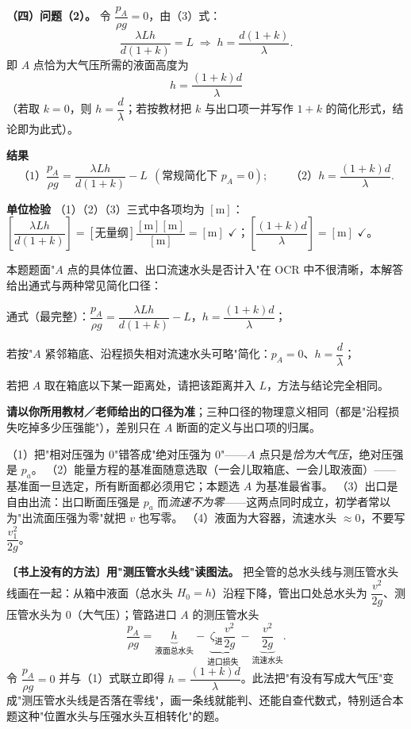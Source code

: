 \begin{jie}
\textbf{（四）问题（2）。} 令 $\dfrac{p_A}{\rho g}=0$，由（3）式：
\[\frac{\lambda Lh}{d(1+k)}=L\;\Longrightarrow\;h=\frac{d(1+k)}{\lambda}.\]
即 $A$ 点恰为大气压所需的液面高度为
\[\boxed{h=\frac{(1+k)d}{\lambda}}\]
（若取 $k=0$，则 $h=\dfrac{d}{\lambda}$；若按教材把 $k$ 与出口项一并写作 $1+k$ 的简化形式，结论即为此式）。

\textbf{结果}
\[\boxed{\text{（1）}\frac{p_A}{\rho g}=\frac{\lambda Lh}{d(1+k)}-L\ \ \left(\text{常规简化下 }p_A=0\right);\qquad
\text{（2）}h=\frac{(1+k)d}{\lambda}}.\]

\textbf{单位检验} （1）（2）（3）三式中各项均为 $[\mathrm{m}]$：$\left[\dfrac{\lambda Lh}{d(1+k)}\right]=[\text{无量纲}]\dfrac{[\mathrm{m}][\mathrm{m}]}{[\mathrm{m}]}=[\mathrm{m}]$ $\checkmark$；$\left[\dfrac{(1+k)d}{\lambda}\right]=[\mathrm{m}]$ $\checkmark$。
\end{jie}
\begin{tishi}
本题题面"$A$ 点的具体位置、出口流速水头是否计入"在 OCR 中不很清晰，本解答给出通式与两种常见简化口径：
\begin{xiaowen}
\item 通式（最完整）：$\dfrac{p_A}{\rho g}=\dfrac{\lambda Lh}{d(1+k)}-L$，$h=\dfrac{(1+k)d}{\lambda}$；
\item 若按"$A$ 紧邻箱底、沿程损失相对流速水头可略"简化：$p_A=0$、$h=\dfrac{d}{\lambda}$；
\item 若把 $A$ 取在箱底以下某一距离处，请把该距离并入 $L$，方法与结论完全相同。
\end{xiaowen}
\textbf{请以你所用教材／老师给出的口径为准}；三种口径的物理意义相同（都是"沿程损失吃掉多少压强能"），差别只在 $A$ 断面的定义与出口项的归属。
\end{tishi}
\begin{yicuo}
（1）把"相对压强为 0"错答成"绝对压强为 0"——$A$ 点只是\emph{恰为大气压}，绝对压强是 $p_a$。
（2）能量方程的基准面随意选取（一会儿取箱底、一会儿取液面）——基准面一旦选定，所有断面都必须用它；本题选 $A$ 为基准最省事。
（3）出口是自由出流：出口断面压强是 $p_a$ 而\emph{流速不为零}——这两点同时成立，初学者常以为"出流面压强为零"就把 $v$ 也写零。
（4）液面为大容器，流速水头 $\approx0$，不要写 $\dfrac{v_1^2}{2g}$。
\end{yicuo}
\begin{banfa}
\textbf{〔书上没有的方法〕用"测压管水头线"读图法。} 把全管的总水头线与测压管水头线画在一起：从箱中液面（总水头 $H_0=h$）沿程下降，管出口处总水头为 $\dfrac{v^2}{2g}$、测压管水头为 $0$（大气压）；管路进口 $A$ 的测压管水头
\[\frac{p_A}{\rho g}=\underbrace{h}_{\text{液面总水头}}-\underbrace{\zeta_{\text{进}}\frac{v^2}{2g}}_{\text{进口损失}}-\underbrace{\frac{v^2}{2g}}_{\text{流速水头}}.\]
令 $\dfrac{p_A}{\rho g}=0$ 并与（1）式联立即得 $h=\dfrac{(1+k)d}{\lambda}$。此法把"有没有写成大气压"变成"测压管水头线是否落在零线"，画一条线就能判、还能自查代数式，特别适合本题这种"位置水头与压强水头互相转化"的题。
\end{banfa}


